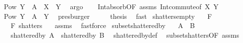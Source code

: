 \begin{isabellebody}
\ {\isachardoublequoteopen}Pow\ Y\ {\isasymsubseteq}\ A\ {\isasyminter}{\isacharasterisk}{\kern0pt}\ {\isacharparenleft}{\kern0pt}X\ {\isasyminter}\ Y{\isacharparenright}{\kern0pt}{\isachardoublequoteclose}\ \isamarkupfalse%
\ argo\isanewline
\ \ \isamarkupfalse%
\ Int{\isacharunderscore}{\kern0pt}absorb{}{\isacharbrackleft}{\kern0pt}OF\ assms{\isacharparenleft}{\kern0pt}{}{\isacharparenright}{\kern0pt}{\isacharbrackright}{\kern0pt}\ Int{\isacharunderscore}{\kern0pt}commute{\isacharbrackleft}{\kern0pt}of\ X\ Y{\isacharbrackright}{\kern0pt}\ \isamarkupfalse%
\ {\isachardoublequoteopen}Pow\ Y\ {\isasymsubseteq}\ A\ {\isasyminter}{\isacharasterisk}{\kern0pt}\ Y{\isachardoublequoteclose}\ \isamarkupfalse%
\ presburger\isanewline
\ \ \isamarkupfalse%
\ \isamarkupfalse%
\ {\isacharquery}{\kern0pt}thesis\ \isamarkupfalse%
\ fast\isanewline
{}\isamarkupfalse%
%
\endisatagproof
{\isafoldproof}%
%
\isadelimproof
\isanewline
%
\endisadelimproof
\isanewline
{}\isamarkupfalse%
\ shatters{\isacharunderscore}{\kern0pt}empty{\isacharcolon}{\kern0pt}\isanewline
\ \ \ {\isachardoublequoteopen}F\ {\isasymnoteq}\ {\isacharbraceleft}{\kern0pt}{\isacharbraceright}{\kern0pt}{\isachardoublequoteclose}\isanewline
\ \ \ {\isachardoublequoteopen}F\ shatters\ {\isacharbraceleft}{\kern0pt}{\isacharbraceright}{\kern0pt}{\isachardoublequoteclose}\ \isanewline
%
\isadelimproof
%
\endisadelimproof
%
\isatagproof
{}\isamarkupfalse%
\ assms\ \isamarkupfalse%
\ fastforce%
\endisatagproof
{\isafoldproof}%
%
\isadelimproof
\isanewline
%
\endisadelimproof
\isanewline
{}\isamarkupfalse%
\ subset{\isacharunderscore}{\kern0pt}shattered{\isacharunderscore}{\kern0pt}by{\isacharcolon}{\kern0pt}\isanewline
\ \ \ {\isachardoublequoteopen}A\ {\isasymsubseteq}\ B{\isachardoublequoteclose}\isanewline
\ \ \ {\isachardoublequoteopen}shattered{\isacharunderscore}{\kern0pt}by\ A\ {\isasymsubseteq}\ shattered{\isacharunderscore}{\kern0pt}by\ B{\isachardoublequoteclose}\ \isanewline
%
\isadelimproof
%
\endisadelimproof
%
\isatagproof
{}\isamarkupfalse%
\ shattered{\isacharunderscore}{\kern0pt}by{\isacharunderscore}{\kern0pt}def\ \isamarkupfalse%
\ subset{\isacharunderscore}{\kern0pt}shatters{\isacharbrackleft}{\kern0pt}OF\ assms{\isacharbrackright}{\kern0pt}\ \isamarkupfalse%

\end{isabellebody}
